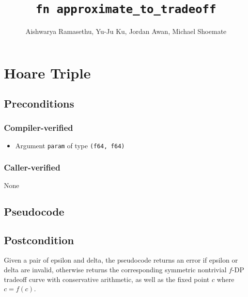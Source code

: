 \documentclass{article}
\title{\texttt{fn approximate\_to\_tradeoff}}
\author{Aishwarya Ramasethu, Yu-Ju Ku, Jordan Awan, Michael Shoemate}
\begin{document}
\maketitle

\contrib

\section{Hoare Triple}

\subsection*{Preconditions}
\subsubsection*{Compiler-verified}
\begin{itemize}
    \item Argument \texttt{param} of type \texttt{(f64, f64)}
\end{itemize}

\subsubsection*{Caller-verified}
None

\subsection*{Pseudocode}



\subsection*{Postcondition}

\begin{theorem}
    Given a pair of epsilon and delta, the pseudocode returns an error if epsilon or delta are invalid,
    otherwise returns the corresponding symmetric nontrivial $f$-DP tradeoff curve
    with conservative arithmetic, 
    as well as the fixed point $c$ where $c = f(c)$.
\end{theorem}
\end{document}
